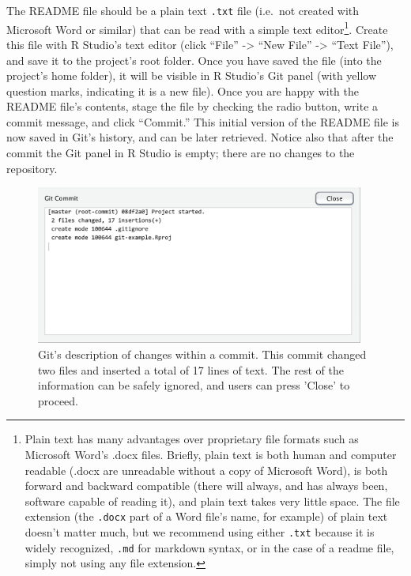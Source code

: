 \documentclass[
  american,
  ,doc,floatsintext]{apa6}
\begin{document}
The README file should be a plain text \texttt{.txt} file (i.e.~not created with Microsoft Word or similar) that can be read with a simple text editor\footnote{Plain text has many advantages over proprietary file formats such as Microsoft Word's .docx files. Briefly, plain text is both human and computer readable (.docx are unreadable without a copy of Microsoft Word), is both forward and backward compatible (there will always, and has always been, software capable of reading it), and plain text takes very little space. The file extension (the \texttt{.docx} part of a Word file's name, for example) of plain text doesn't matter much, but we recommend using either \texttt{.txt} because it is widely recognized, \texttt{.md} for markdown syntax, or in the case of a readme file, simply not using any file extension.}. Create this file with R Studio's text editor (click ``File'' -\textgreater{} ``New File'' -\textgreater{} ``Text File''), and save it to the project's root folder. Once you have saved the file (into the project's home folder), it will be visible in R Studio's Git panel (with yellow question marks, indicating it is a new file). Once you are happy with the README file's contents, stage the file by checking the radio button, write a commit message, and click ``Commit.'' This initial version of the README file is now saved in Git's history, and can be later retrieved. Notice also that after the commit the Git panel in R Studio is empty; there are no changes to the repository.

\begin{figure}

{\centering \includegraphics[width=4.25in]{images/rstudio-git-3} 

}

\caption{Git's description of changes within a commit. This commit changed two files and inserted a total of 17 lines of text. The rest of the information can be safely ignored, and users can press 'Close' to proceed.}\label{fig:rstudio-git-3}
\end{figure}
\end{document}
